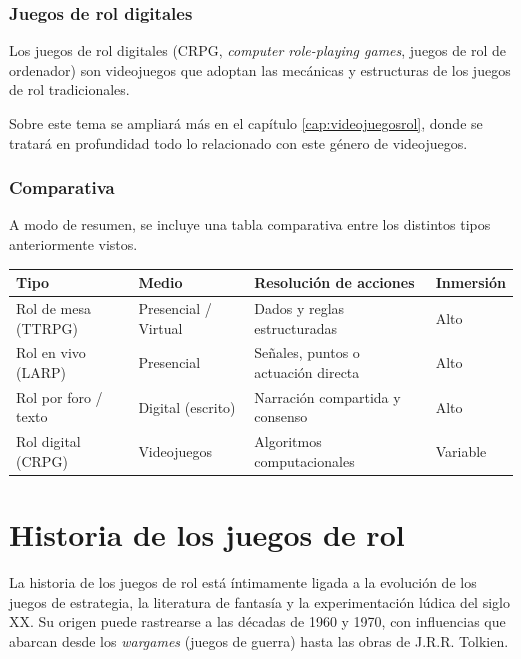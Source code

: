 \subsubsection{Juegos de rol digitales}
Los juegos de rol digitales (CRPG, \textit{computer role-playing games}, juegos de rol de ordenador) son videojuegos que adoptan las mecánicas y estructuras de los juegos de rol tradicionales.

\medskip

Sobre este tema se ampliará más en el capítulo \ref{cap:videojuegosrol}, donde se tratará en profundidad todo lo relacionado con este género de videojuegos.

\subsubsection{Comparativa}
A modo de resumen, se incluye una tabla comparativa entre los distintos tipos anteriormente vistos.
\begin{table}[H]
	\centering
	\begin{tabularx}{\textwidth}{@{} X X X X @{}} 
		\toprule
		\textbf{Tipo} & \textbf{Medio} & \textbf{Resolución de acciones} & \textbf{Inmersión} \\
		\midrule
		Rol de mesa (TTRPG) & Presencial / Virtual & Dados y reglas estructuradas & Alto \\
		Rol en vivo (LARP) & Presencial & Señales, puntos o actuación directa & Alto \\
		Rol por foro / texto & Digital (escrito) & Narración compartida y consenso & Alto \\						Rol digital (CRPG) & Videojuegos & Algoritmos computacionales & Variable \\
		\bottomrule
	\end{tabularx}
\end{table}

\section{Historia de los juegos de rol}

La historia de los juegos de rol está íntimamente ligada a la evolución de los juegos de estrategia, la literatura de fantasía y la experimentación lúdica del siglo XX. Su origen puede rastrearse a las décadas de 1960 y 1970, con influencias que abarcan desde los \textit{wargames} (juegos de guerra) hasta las obras de J.R.R. Tolkien.

\medskip

